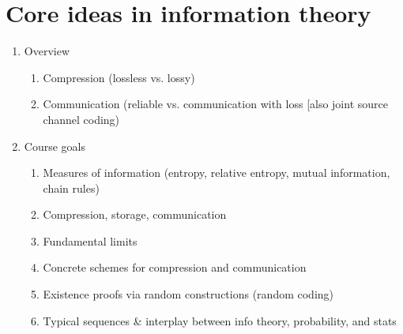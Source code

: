 \section{Core ideas in information theory}
\begin{enumerate}
  \item Overview
    \begin{enumerate}
      \item Compression (lossless vs. lossy)
      \item Communication (reliable vs. communication with loss [also joint source channel coding)
    \end{enumerate}
  \item Course goals
    \begin{enumerate}
      \item Measures of information (entropy, relative entropy, mutual information, chain rules)
      \item Compression, storage, communication
      \item Fundamental limits
      \item Concrete schemes for compression and communication
      \item Existence proofs via random constructions (random coding)
      \item Typical sequences & interplay between info theory, probability, and stats
    \end{enumerate}

\end{enumerate}

